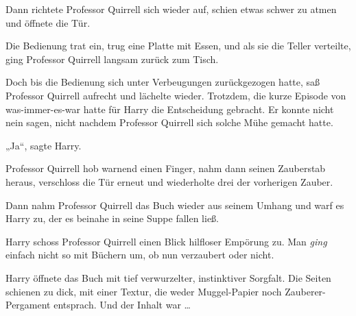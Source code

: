 Dann richtete Professor Quirrell sich wieder auf, schien etwas schwer zu atmen und öffnete die Tür.

Die Bedienung trat ein, trug eine Platte mit Essen, und als sie die Teller verteilte, ging Professor Quirrell langsam zurück zum Tisch.

Doch bis die Bedienung sich unter Verbeugungen zurückgezogen hatte, saß Professor Quirrell aufrecht und lächelte wieder.
Trotzdem, die kurze Episode von was-immer-es-war hatte für Harry die Entscheidung gebracht. Er konnte nicht nein sagen, nicht nachdem Professor Quirrell sich solche Mühe gemacht hatte.

„Ja“, sagte Harry.

Professor Quirrell hob warnend einen Finger, nahm dann seinen Zauberstab heraus, verschloss die Tür erneut und wiederholte drei der vorherigen Zauber.

Dann nahm Professor Quirrell das Buch wieder aus seinem Umhang und warf es Harry zu, der es beinahe in seine Suppe fallen ließ.

Harry schoss Professor Quirrell einen Blick hilfloser Empörung zu. Man \emph{ging} einfach nicht so mit Büchern um, ob nun verzaubert oder nicht.

Harry öffnete das Buch mit tief verwurzelter, instinktiver Sorgfalt. Die Seiten schienen zu dick, mit einer Textur, die weder Muggel-Papier noch Zauberer-Pergament entsprach. Und der Inhalt war …


